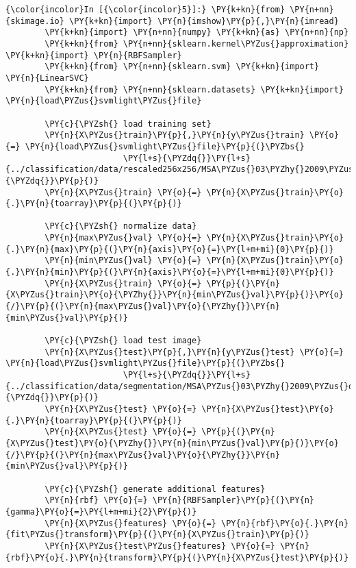     \begin{Verbatim}[commandchars=\\\{\}]
{\color{incolor}In [{\color{incolor}5}]:} \PY{k+kn}{from} \PY{n+nn}{skimage.io} \PY{k+kn}{import} \PY{n}{imshow}\PY{p}{,}\PY{n}{imread}
        \PY{k+kn}{import} \PY{n+nn}{numpy} \PY{k+kn}{as} \PY{n+nn}{np}
        \PY{k+kn}{from} \PY{n+nn}{sklearn.kernel\PYZus{}approximation} \PY{k+kn}{import} \PY{n}{RBFSampler}
        \PY{k+kn}{from} \PY{n+nn}{sklearn.svm} \PY{k+kn}{import} \PY{n}{LinearSVC}
        \PY{k+kn}{from} \PY{n+nn}{sklearn.datasets} \PY{k+kn}{import} \PY{n}{load\PYZus{}svmlight\PYZus{}file}
        
        \PY{c}{\PYZsh{} load training set}
        \PY{n}{X\PYZus{}train}\PY{p}{,}\PY{n}{y\PYZus{}train} \PY{o}{=} \PY{n}{load\PYZus{}svmlight\PYZus{}file}\PY{p}{(}\PYZbs{}
                        \PY{l+s}{\PYZdq{}}\PY{l+s}{../classification/data/rescaled256x256/MSA\PYZus{}03\PYZhy{}2009\PYZus{}dXXXX\PYZhy{}XX\PYZhy{}XX\PYZus{}s0110.svm}\PY{l+s}{\PYZdq{}}\PY{p}{)}
        \PY{n}{X\PYZus{}train} \PY{o}{=} \PY{n}{X\PYZus{}train}\PY{o}{.}\PY{n}{toarray}\PY{p}{(}\PY{p}{)}
        
        \PY{c}{\PYZsh{} normalize data}
        \PY{n}{max\PYZus{}val} \PY{o}{=} \PY{n}{X\PYZus{}train}\PY{o}{.}\PY{n}{max}\PY{p}{(}\PY{n}{axis}\PY{o}{=}\PY{l+m+mi}{0}\PY{p}{)}
        \PY{n}{min\PYZus{}val} \PY{o}{=} \PY{n}{X\PYZus{}train}\PY{o}{.}\PY{n}{min}\PY{p}{(}\PY{n}{axis}\PY{o}{=}\PY{l+m+mi}{0}\PY{p}{)}
        \PY{n}{X\PYZus{}train} \PY{o}{=} \PY{p}{(}\PY{n}{X\PYZus{}train}\PY{o}{\PYZhy{}}\PY{n}{min\PYZus{}val}\PY{p}{)}\PY{o}{/}\PY{p}{(}\PY{n}{max\PYZus{}val}\PY{o}{\PYZhy{}}\PY{n}{min\PYZus{}val}\PY{p}{)}
        
        \PY{c}{\PYZsh{} load test image}
        \PY{n}{X\PYZus{}test}\PY{p}{,}\PY{n}{y\PYZus{}test} \PY{o}{=} \PY{n}{load\PYZus{}svmlight\PYZus{}file}\PY{p}{(}\PYZbs{}
                        \PY{l+s}{\PYZdq{}}\PY{l+s}{../classification/data/segmentation/MSA\PYZus{}03\PYZhy{}2009\PYZus{}dXXXX\PYZhy{}XX\PYZhy{}XX\PYZus{}s0200.svm}\PY{l+s}{\PYZdq{}}\PY{p}{)}
        \PY{n}{X\PYZus{}test} \PY{o}{=} \PY{n}{X\PYZus{}test}\PY{o}{.}\PY{n}{toarray}\PY{p}{(}\PY{p}{)}
        \PY{n}{X\PYZus{}test} \PY{o}{=} \PY{p}{(}\PY{n}{X\PYZus{}test}\PY{o}{\PYZhy{}}\PY{n}{min\PYZus{}val}\PY{p}{)}\PY{o}{/}\PY{p}{(}\PY{n}{max\PYZus{}val}\PY{o}{\PYZhy{}}\PY{n}{min\PYZus{}val}\PY{p}{)}
        
        \PY{c}{\PYZsh{} generate additional features}
        \PY{n}{rbf} \PY{o}{=} \PY{n}{RBFSampler}\PY{p}{(}\PY{n}{gamma}\PY{o}{=}\PY{l+m+mi}{2}\PY{p}{)}
        \PY{n}{X\PYZus{}features} \PY{o}{=} \PY{n}{rbf}\PY{o}{.}\PY{n}{fit\PYZus{}transform}\PY{p}{(}\PY{n}{X\PYZus{}train}\PY{p}{)}
        \PY{n}{X\PYZus{}test\PYZus{}features} \PY{o}{=} \PY{n}{rbf}\PY{o}{.}\PY{n}{transform}\PY{p}{(}\PY{n}{X\PYZus{}test}\PY{p}{)}
        

\end{Verbatim}
